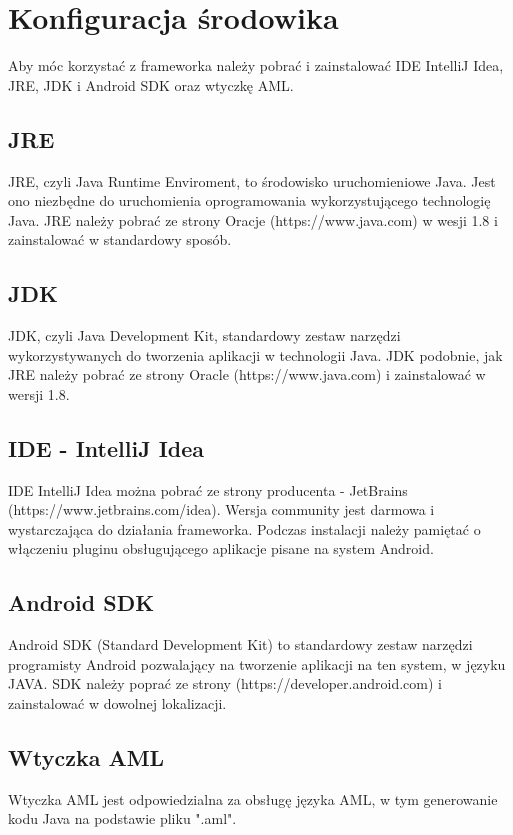 \documentclass	{xmgr}
\begin{document}
\section{Konfiguracja środowika}

Aby móc korzystać z frameworka należy pobrać i zainstalować IDE IntelliJ Idea, JRE, JDK i Android SDK oraz wtyczkę AML.

\subsection{JRE}

JRE, czyli Java Runtime Enviroment, to środowisko uruchomieniowe Java. Jest ono 
niezbędne do uruchomienia oprogramowania wykorzystującego technologię Java. JRE należy pobrać ze strony Oracje (https://www.java.com) w wesji 1.8 i zainstalować w standardowy sposób.

\subsection{JDK}

JDK, czyli Java Development Kit, standardowy zestaw narzędzi wykorzystywanych do tworzenia aplikacji w technologii Java. JDK podobnie, jak JRE należy pobrać ze strony Oracle (https://www.java.com) i zainstalować w wersji 1.8.

\subsection{IDE - IntelliJ Idea}

IDE IntelliJ Idea można pobrać ze strony producenta - JetBrains (https://www.jetbrains.com/idea). Wersja community jest darmowa i wystarczająca do działania frameworka. Podczas instalacji należy pamiętać o włączeniu pluginu obsługującego aplikacje pisane na system Android.

\subsection{Android SDK}

Android SDK (Standard Development Kit) to standardowy zestaw narzędzi programisty Android pozwalający na tworzenie aplikacji na ten system, w języku JAVA. SDK należy poprać ze strony (https://developer.android.com) i zainstalować w dowolnej lokalizacji.

\subsection{Wtyczka AML}
Wtyczka AML jest odpowiedzialna za obsługę języka AML, w tym generowanie kodu Java na podstawie pliku ".aml". 
\end{document}
